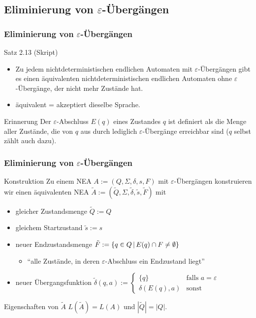 \subsection{Eliminierung von $\varepsilon$-Übergängen}
\begin{frame}
	\frametitle{Eliminierung von $\varepsilon$-Übergängen}
	\begin{block}{Satz 2.13 (Skript)}
	\begin{itemize}
	 \item Zu jedem nichtdeterministischen endlichen Automaten mit \(\varepsilon\)-Übergängen gibt es einen äquivalenten nichtdeterministischen
	 endlichen Automaten ohne \(\varepsilon\)-Übergänge, der nicht mehr Zustände hat.
	 \item äquivalent = akzeptiert dieselbe Sprache.
	\end{itemize}
	\end{block}
	\begin{block}{Erinnerung}
		Der \(\varepsilon\)-Abschluss $E(q)$ eines Zustandes $q$ ist definiert als die Menge aller Zustände, die von $q$ aus durch lediglich \(\varepsilon\)-Übergänge erreichbar sind ($q$ selbst zählt auch dazu).
	\end{block}
\end{frame}
\begin{frame}
\frametitle{Eliminierung von $\varepsilon$-Übergängen}
	\begin{block}{Konstruktion}
	Zu einem NEA \(A := (Q, \Sigma, \delta, s, F)\) mit \(\varepsilon\)-Übergängen konstruieren wir einen 
	  äquivalenten NEA \(\tilde{A} := (\tilde{Q}, \Sigma, \tilde{\delta}, \tilde{s}, \tilde{F})\) mit
	 \begin{itemize}
	 \item gleicher Zustandsmenge \(\tilde{Q} := Q\)
	 \item gleichem Startzustand \(\tilde{s} := s\)
	 \item neuer Endzustandsmenge \(\tilde{F} := \left\lbrace q \in Q \,\middle\vert\, E(q)\cap F \neq \emptyset \right\rbrace\)
	 \begin{itemize}
	 	\item ``alle Zustände, in deren $\varepsilon$-Abschluss ein Endzustand liegt''
	 \end{itemize}
	 \item neuer Übergangsfunktion $\tilde{\delta}(q,a) := 
	 \begin{cases}
	  \{q\}			& \text{falls $a = \varepsilon$} \\
	 \delta(E(q),a)	& \text{sonst}
	 \end{cases}$
	 \end{itemize}
	\end{block}
	\begin{block}{Eigenschaften von \(\tilde{A}\)}
	 \(L(\tilde{A}) = L(A)\) und \(|\tilde{Q}| = |Q|\).
	\end{block}

\end{frame}
